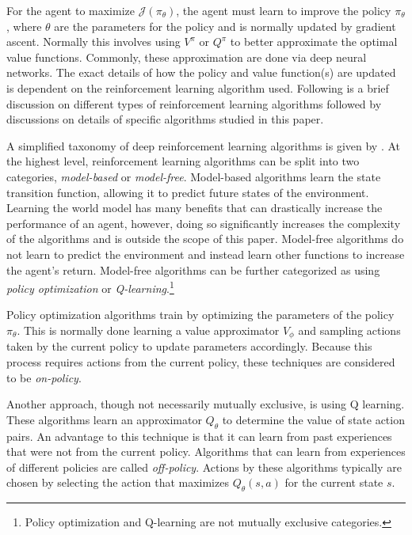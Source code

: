 \documentclass[conference]{IEEEtran}
\begin{document}
For the agent to maximize $\mathcal{J}(\pi_\theta)$, the agent must learn to improve the policy $\pi_\theta$, where $\theta$ are the parameters for the policy and is normally updated by gradient ascent. Normally this involves using $V^\pi$ or $Q^\pi$ to better approximate the optimal value functions. Commonly, these approximation are done via deep neural networks. The exact details of how the policy and value function(s) are updated is dependent on the reinforcement learning algorithm used. Following is a brief discussion on different types of reinforcement learning algorithms followed by discussions on details of specific algorithms studied in this paper.

A simplified taxonomy of deep reinforcement learning algorithms is given by \cite{spinning_up_taxonomy}. At the highest level, reinforcement learning algorithms can be split into two categories, \textit{model-based} or \textit{model-free}. Model-based algorithms learn the state transition function, allowing it to predict future states of the environment. Learning the world model has many benefits that can drastically increase the performance of an agent, however, doing so significantly increases the complexity of the algorithms and is outside the scope of this paper. Model-free algorithms do not learn to predict the environment and instead learn other functions to increase the agent's return. Model-free algorithms can be further categorized as using \textit{policy optimization} or \textit{Q-learning}.\footnote{Policy optimization and Q-learning are not mutually exclusive categories.}

Policy optimization algorithms train by optimizing the parameters of the policy $\pi_\theta$. This is normally done learning a value approximator $V_\phi$ and sampling actions taken by the current policy to update parameters accordingly. Because this process requires actions from the current policy, these techniques are considered to be \textit{on-policy}.

Another approach, though not necessarily mutually exclusive, is using Q learning. These algorithms learn an approximator $Q_\theta$ to determine the value of state action pairs. An advantage to this technique is that it can learn from past experiences that were not from the current policy. Algorithms that can learn from experiences of different policies are called \textit{off-policy}. Actions by these algorithms typically are chosen by selecting the action that maximizes $Q_\theta(s, a)$ for the current state $s$.
\end{document}
